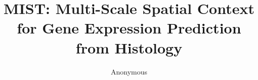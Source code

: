 \documentclass[11pt]{article}
\newcommand{\morph}{\textbf{MIST}}
\begin{document}
\title{MIST: Multi-Scale Spatial Context for Gene Expression Prediction from Histology}

\author{Anonymous}
\maketitle

\end{document}
